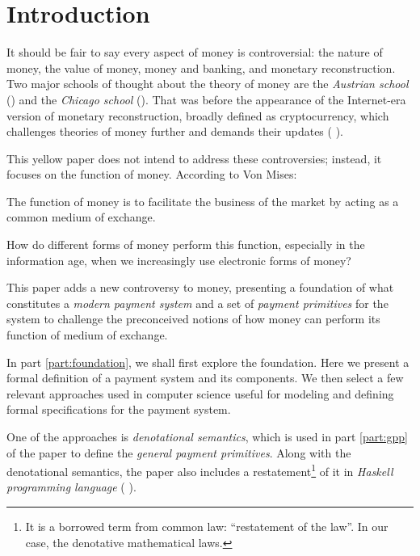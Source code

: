 \part*{Introduction}

It should be fair to say every aspect of money is controversial: the nature of money, the value of
money, money and banking, and monetary reconstruction. Two major schools of thought about the theory
of money are the \textit{Austrian school} (\cite{von2013theory}) and the \textit{Chicago school}
(\cite{friedman1989quantity}). That was before the appearance of the Internet-era version of
monetary reconstruction, broadly defined as cryptocurrency, which challenges theories of money
further and demands their updates (\cite{ammous2018can} \cite{hardle2020understanding}).

This yellow paper does not intend to address these controversies; instead, it focuses on the
function of money. According to Von Mises:

\begin{displayquote}
The function of money is to facilitate the business of the market by acting as a common medium of
exchange. 
\end{displayquote}

How do different forms of money perform this function, especially in the information age, when we
increasingly use electronic forms of money?

This paper adds a new controversy to money, presenting a foundation of what constitutes
a \textit{modern payment system} and a set of \textit{payment primitives} for the system to
challenge the preconceived notions of how money can perform its function of medium of exchange.

In part \ref{part:foundation}, we shall first explore the foundation. Here we present a formal
definition of a payment system and its components. We then select a few relevant approaches used in
computer science useful for modeling and defining formal specifications for the payment system.

One of the approaches is \textit{denotational semantics}, which is used in part \ref{part:gpp} of
the paper to define the \textit{general payment primitives}. Along with the denotational semantics,
the paper also includes a restatement\footnote{It is a borrowed term from common law: ``restatement
of the law''. In our case, the denotative mathematical laws.} of it in \textit{Haskell programming
language} (\cite{hudak1992report} \cite{jones2003haskell} \cite{marlow2010haskell}).

